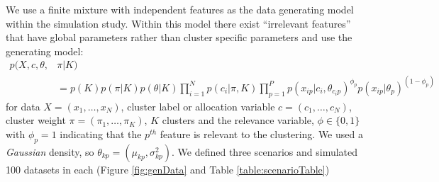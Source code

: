 \documentclass{bmcart}
\begin{document}
We use a finite mixture with independent features as the data generating model within the simulation study.
Within this model there exist ``irrelevant features'' \citep{law2003feature} that have global parameters rather than cluster specific parameters and use the generating model:
\begin{align*}
    p(X, c, \theta, & \pi| K) \\ 
     & = p(K) p(\pi| K) p(\theta|K) \prod_{i=1}^N p (c_i | \pi, K)  \prod_{p=1}^P p(x_{ip} | c_i, \theta_{c_ip})^ {\phi_p} p(x_{ip} | \theta_p) ^ {(1 - \phi_p)}
\end{align*}
for data $X=(x_1, \ldots, x_N)$, cluster label or allocation variable $c=(c_1, \ldots, c_N)$, cluster weight $\pi=(\pi_1, \ldots, \pi_K)$, $K$ clusters and the relevance variable, $\phi \in \{0, 1\}$ with $\phi_p=1$ indicating that the $p^{th}$ feature is relevant to the clustering. We used a \emph{Gaussian} density, so $\theta_{kp} = (\mu_{kp}, \sigma^2_{kp})$. We defined three scenarios and simulated 100 datasets in each (Figure \ref{fig:genData} and Table \ref{table:scenarioTable}) 
\end{document}
